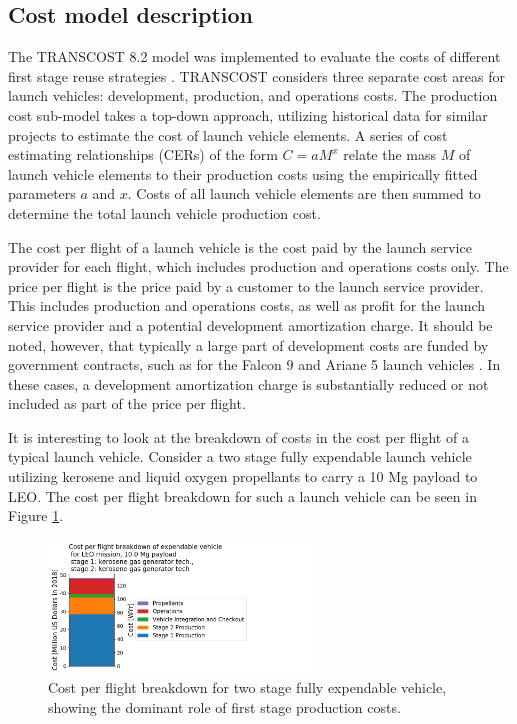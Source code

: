 \documentclass{iaf-iac}
\begin{document}
\begin{multicols}{2}
\subsection{Cost model description} \label{sec:cost_model_description}

The TRANSCOST 8.2 model was implemented to evaluate the costs of different first stage reuse strategies \cite{transcost}. TRANSCOST considers three separate cost areas for launch vehicles: development, production, and operations costs. The production cost sub-model takes a top-down approach, utilizing historical data for similar projects to estimate the cost of launch vehicle elements. A series of cost estimating relationships (CERs) of the form $C = a M^x$ relate the mass $M$ of launch vehicle elements to their production costs using the empirically fitted parameters $a$ and $x$. Costs of all launch vehicle elements are then summed to determine the total launch vehicle production cost. 

The cost per flight of a launch vehicle is the cost paid by the launch service provider for each flight, which includes production and operations costs only. The price per flight is the price paid by a customer to the launch service provider. This includes production and operations costs, as well as profit for the launch service provider and a potential development amortization charge. It should be noted, however, that typically a large part of development costs are funded by government contracts, such as for the Falcon 9 and Ariane 5 launch vehicles \cite{NASAspaceX, ESAAriane5}. In these cases, a development amortization charge is substantially reduced or not included as part of the price per flight.

It is interesting to look at the breakdown of costs in the cost per flight of a typical launch vehicle. Consider a two stage fully expendable launch vehicle utilizing kerosene and liquid oxygen propellants to carry a 10 Mg payload to LEO. The cost per flight breakdown for such a launch vehicle can be seen in Figure \ref{fig:expendable_cost_breakdown}. 


\begin{figure}[H]
    \centering
    \includegraphics[width=0.63\textwidth]{../../lvreuse/analysis/combined/plots/expendable_cost_breakdown_paper}
    \caption{\label{fig:expendable_cost_breakdown} Cost per flight breakdown for two stage fully expendable vehicle, showing the dominant role of first stage production costs.}
\end{figure}



\end{multicols}
\end{document}
